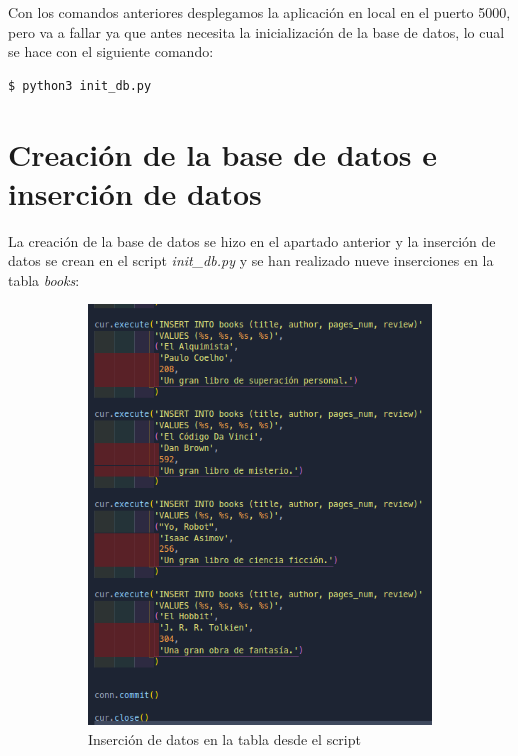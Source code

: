 \documentclass[11pt]{report}
\begin{document}
Con los comandos anteriores desplegamos la aplicación en local en el puerto 5000, pero va a
fallar ya que antes necesita la inicialización de la base de datos, lo cual se hace con el
siguiente comando:
\begin{verbatim}
$ python3 init_db.py
\end{verbatim}

\section{Creación de la base de datos e inserción de datos}
La creación de la base de datos se hizo en el apartado anterior y la inserción de datos se crean en el
script \emph{init\_db.py} y se han realizado nueve inserciones en la tabla \emph{books}:
\begin{figure}[H]
  \begin{subfigure}{0.5\textwidth}
    \centering
    \includegraphics[scale=0.4]{img/inserted_books_1.png}
    \caption{Inserción de datos en la tabla desde el script}
  \end{subfigure}%
  \begin{subfigure}{0.5\textwidth}

\end{subfigure}
\end{figure}
\end{document}
